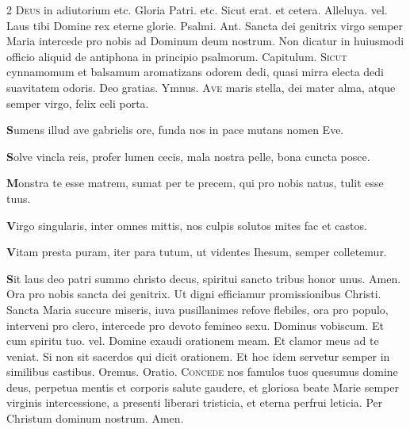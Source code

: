 \begin{multicols*}{2}
{\color{Red} }
\lettrine[lines=2]{\zallmancaps \color{Red} D}{eus} in adiutorium {\color{Red} etc.} Gloria Patri. {\color{Red} etc.} Sicut erat. {\color{Red} et cetera.} Alleluya. {\color{Red} vel.} Laus tibi Domine rex eterne glorie. {\color{Red} Psalmi.}
{\color{Red} Ant.} Sancta dei genitrix virgo semper Maria intercede pro nobis ad Dominum deum nostrum. {\color{Red} Non dicatur in huiusmodi officio aliquid de antiphona in principio psalmorum. Capitulum.}
\lettrine[lines=2]{\zallmancaps \color{Blue} S}{icut} cynnamomum et balsamum aromatizans odorem dedi, quasi mirra electa dedi suavitatem odoris. Deo gratias. {\color{Red} Ymnus.}
\lettrine[lines=2]{\zallmancaps \color{Red} A}{ve} maris stella,
dei mater alma,
atque semper virgo,
felix celi porta.
\par {\bfseries \color{Blue} S}umens illud ave
gabrielis ore,
funda nos in pace
mutans nomen Eve.
\par {\bfseries \color{Red} S}olve vincla reis,
profer lumen cecis,
mala nostra pelle,
bona cuncta posce.
\par {\bfseries \color{Blue} M}onstra te esse matrem,
sumat per te precem,
qui pro nobis natus,
tulit esse tuus.
\par {\bfseries \color{Red} V}irgo singularis,
inter omnes mittis,
nos culpis solutos
mites fac et castos.
\par {\bfseries \color{Blue} V}itam presta puram,
iter para tutum,
ut videntes Ihesum,
semper colletemur.
\par {\bfseries \color{Red} S}it laus deo patri
summo christo decus,
spiritui sancto
tribus honor unus. Amen.
\newline \V Ora pro nobis sancta dei genitrix.
\newline \R Ut digni efficiamur promissionibus Christi.
 Sancta Maria succure miseris, iuva pusillanimes refove flebiles, ora pro populo, interveni pro clero, intercede pro devoto femineo sexu. Dominus vobiscum. Et cum spiritu tuo. {\color{Red} vel.} Domine exaudi orationem meam. Et clamor meus ad te veniat. {\color{Red} Si non sit sacerdos qui dicit orationem. Et hoc idem servetur semper in similibus castibus. Oremus. Oratio.}
\lettrine[lines=2]{\zallmancaps \color{Blue} C}{oncede} nos famulos tuos quesumus domine deus, perpetua mentis et corporis salute gaudere, et gloriosa beate Marie semper virginis intercessione, a presenti liberari tristicia, et eterna perfrui leticia. Per Christum dominum nostrum. Amen.

\end{multicols*}
